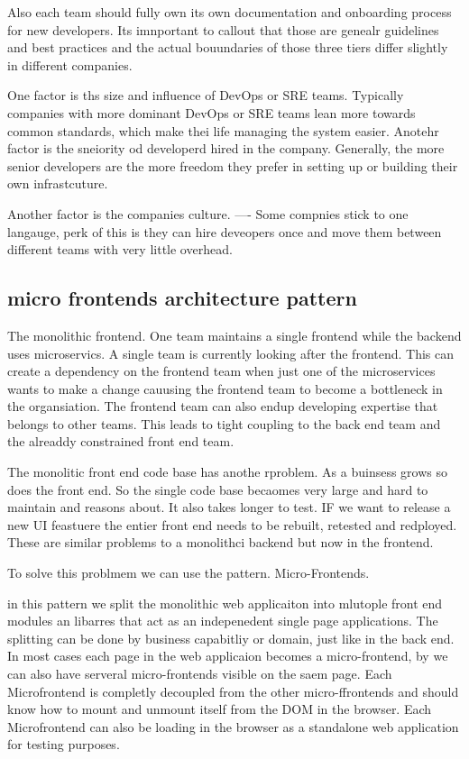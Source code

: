 \documentclass[a4paper, 11pt]{book}
\begin{document}
{    Also each team should fully own its own documentation and onboarding process for new developers.
    Its imnportant to callout that those are genealr guidelines and best practices and the actual bouundaries of those three tiers differ slightly in different companies.

    One factor is ths size and influence of DevOps or SRE teams.
    Typically companies with more dominant DevOps or SRE teams lean more towards common standards, which make thei life managing the system easier.
    Anotehr factor is the sneiority od developerd hired in the company.
    Generally, the more senior developers are the more freedom they prefer in setting up or building their own infrastcuture.

    Another factor is the companies culture.
    ---- Some compnies stick to one langauge, perk of this is they can hire deveopers once and move them between different teams with very little overhead.

    \subsection{micro frontends architecture pattern}
    The monolithic frontend. One team maintains a single frontend while the backend uses microservics. A single team is currently looking after the frontend.
    This can create a dependency on the frontend team when just one of the microservices wants to make a change cauusing the frontend team to become a bottleneck in the organsiation.
    The frontend team can also endup developing expertise that belongs to other teams.
    This leads to tight coupling to the back end team and the alreaddy constrained front end team.

    The monolitic front end code base has anothe rproblem.
    As a buinsess grows so does the front end.
    So the single code base becaomes very large and hard to maintain and reasons about.
    It also takes longer to test.
    IF we want to release a new UI feastuere the entier front end needs to be rebuilt, retested and redployed.
    These are similar problems to a monolithci backend but now in the frontend.

    To solve this problmem we can use the pattern. Micro-Frontends.

    in this pattern we split the monolithic web applicaiton into mlutople front end modules an libarres that act as an indepenedent single page applications.
    The splitting can be done by business capabitliy or domain, just like in the back end.
    In most cases each page in the web applicaion becomes a micro-frontend, by we can also have serveral micro-frontends visible on the saem page.
    Each Microfrontend is completly decoupled from the other micro-ffrontends and should know how to mount and unmount itself from the DOM in the browser.
    Each Microfrontend can also be loading in the browser as a standalone web application for testing purposes.

}
\end{document}
